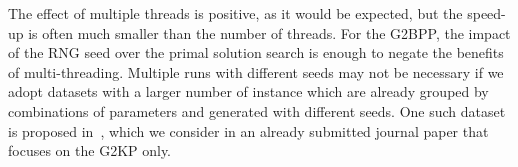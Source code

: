 \documentclass[9pt]{entcs}
\begin{document}
The effect of multiple threads is positive, as it would be expected, but the speed-up is often much smaller than the number of threads.
For the G2BPP, the impact of the RNG seed over the primal solution search is enough to negate the benefits of multi-threading.
Multiple runs with different seeds may not be necessary if we adopt datasets with a larger number of instance which are already grouped by combinations of parameters and generated with different seeds.
One such dataset is proposed in~\cite{velasco:2019}, which we consider in an already submitted journal paper that focuses on the G2KP only.


\newpage


\end{document}
